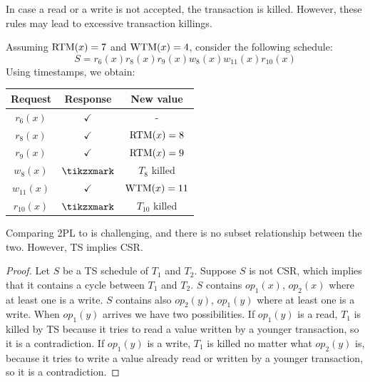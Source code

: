 In case a read or a write is not accepted, the transaction is killed.
However, these rules may lead to excessive transaction killings.
\begin{example}
    Assuming $\textnormal{RTM}(x)=7$ and $\textnormal{WTM}(x)=4$, consider the following schedule:
    \[S=r_6(x) r_8(x) r_9(x) w_8(x) w_{11}(x) r_{10}(x)\]
    Using timestamps, we obtain:
    \begin{table}[H]
        \centering
        \begin{tabular}{ccc}
        \textbf{Request} & \textbf{Response} & \textbf{New value} \\ \hline
        $r_6(x)$         & $\checkmark$      & -                  \\
        $r_8(x)$         & $\checkmark$      & $\textnormal{RTM}(x)=8$         \\
        $r_9(x)$         & $\checkmark$      & $\textnormal{RTM}(x)=9$         \\
        $w_8(x)$         & $\tikzxmark$      & $T_8$ killed       \\
        $w_{11}(x)$      & $\checkmark$      & $\textnormal{WTM}(x)=11$        \\
        $r_{10}(x)$      & $\tikzxmark$      & $T_{10}$ killed   
        \end{tabular}
    \end{table}
\end{example}
Comparing 2PL to is challenging, and there is no subset relationship between the two. 
However, TS implies CSR.
\begin{proof}
    Let $S$ be a TS schedule of $T_1$ and $T_2$. Suppose $S$ is not CSR, which implies that it contains a cycle between $T_1$ and $T_2$. 
    $S$ contains $op_1(x)$, $op_2(x)$ where at least one is a write. 
    $S$ contains also $op_2(y)$, $op_1(y)$ where at least one is a write. 
    When $op_1(y)$ arrives we have two possibilities. 
    If $op_1(y)$ is a read, $T_1$ is killed by TS because it tries to read a value written by a younger transaction, so it is a contradiction. 
    If $op_1(y)$ is a write, $T_1$ is killed no matter what $op_2(y)$ is, because it tries to write a value already read or written by a younger transaction, so it is a contradiction. 
\end{proof}

